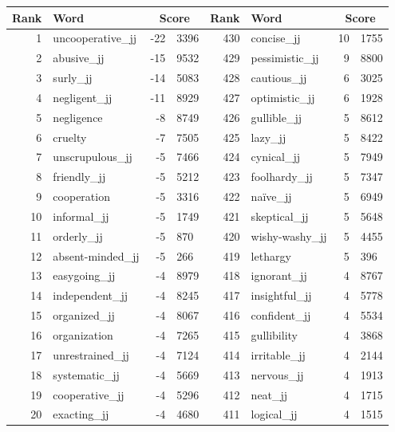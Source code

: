 \begin{table}[tbp]
    \begin{tabular}{| rlr@{.}l | rlr@{.}l |}
    \hline
    \textbf{Rank} & \textbf{Word} & \multicolumn{2}{c|}{\textbf{Score}} & \textbf{Rank} & \textbf{Word} & \multicolumn{2}{c|}{\textbf{Score}} \\
    \hline
    1 & uncooperative\_jj & -22 & 3396    &    430 & concise\_jj & 10 & 1755 \\
    2 & abusive\_jj & -15 & 9532    &    429 & pessimistic\_jj & 9 & 8800 \\
    3 & surly\_jj & -14 & 5083    &    428 & cautious\_jj & 6 & 3025 \\
    4 & negligent\_jj & -11 & 8929    &    427 & optimistic\_jj & 6 & 1928 \\
    5 & negligence & -8 & 8749    &    426 & gullible\_jj & 5 & 8612 \\
    6 & cruelty & -7 & 7505    &    425 & lazy\_jj & 5 & 8422 \\
    7 & unscrupulous\_jj & -5 & 7466    &    424 & cynical\_jj & 5 & 7949 \\
    8 & friendly\_jj & -5 & 5212    &    423 & foolhardy\_jj & 5 & 7347 \\
    9 & cooperation & -5 & 3316    &    422 & naïve\_jj & 5 & 6949 \\
    10 & informal\_jj & -5 & 1749    &    421 & skeptical\_jj & 5 & 5648 \\
    11 & orderly\_jj & -5 & 870    &    420 & wishy-washy\_jj & 5 & 4455 \\
    12 & absent-minded\_jj & -5 & 266    &    419 & lethargy & 5 & 396 \\
    13 & easygoing\_jj & -4 & 8979    &    418 & ignorant\_jj & 4 & 8767 \\
    14 & independent\_jj & -4 & 8245    &    417 & insightful\_jj & 4 & 5778 \\
    15 & organized\_jj & -4 & 8067    &    416 & confident\_jj & 4 & 5534 \\
    16 & organization & -4 & 7265    &    415 & gullibility & 4 & 3868 \\
    17 & unrestrained\_jj & -4 & 7124    &    414 & irritable\_jj & 4 & 2144 \\
    18 & systematic\_jj & -4 & 5669    &    413 & nervous\_jj & 4 & 1913 \\
    19 & cooperative\_jj & -4 & 5296    &    412 & neat\_jj & 4 & 1715 \\
    20 & exacting\_jj & -4 & 4680    &    411 & logical\_jj & 4 & 1515 \\

\end{tabular}
\end{table}
